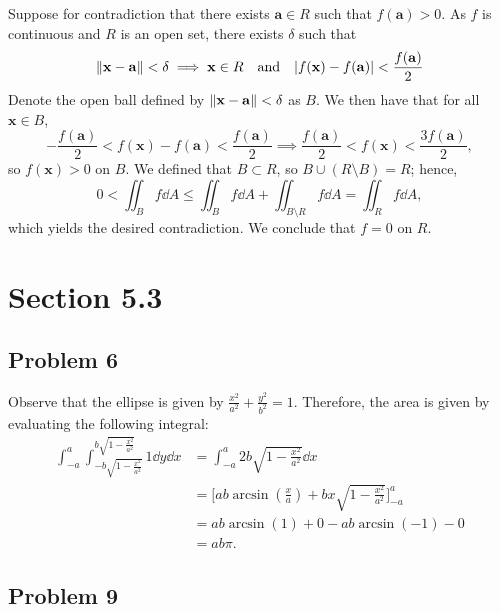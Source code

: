 \documentclass[11pt]{article}
\renewcommand{\vec}[1]{\mathbf{#1}}
\begin{document}
Suppose for contradiction that there exists $\vec{a} \in R$ such that $f(\vec{a}) > 0$. As $f$ is continuous and $R$ is an open set, there exists $\delta$ such that
\[
	\norm{\vec{x} - \vec{a}} < \delta \implies \vec{x} \in R \quad \text{and} \quad \abs{f(\vec{x}) - f(\vec{a})} < \frac{f(\vec{a})}{2}
\]
Denote the open ball defined by $\norm{\vec{x} - \vec{a}} < \delta$ as $B$. We then have that for all $\vec{x} \in B$, 
\[
	-\frac{f(\vec{a})}{2} < f(\vec{x}) - f(\vec{a}) < \frac{f(\vec{a})}{2} \implies \frac{f(\vec{a})}{2} < f(\vec{x}) < \frac{3f(\vec{a})}{2},
\]
so $f(\vec{x}) > 0$ on $B$. We defined that $B \subset R$, so $B \cup (R \setminus B) = R$; hence,
\[
	0 < \iint_{B} f \dd{A} \le \iint_{B} f \dd{A} + \iint_{B \setminus R} f \dd{A} = \iint_{R} f \dd{A},
\]
which yields the desired contradiction. We conclude that $f = 0$ on $R$.


\section{Section 5.3}


\subsection*{Problem 6}

Observe that the ellipse is given by $\tfrac{x^{2}}{a^{2}} + \tfrac{y^{2}}{b^{2}} = 1$. Therefore, the area is given by evaluating the following integral:
\begin{align*}
	\int_{-a}^{a} \int_{-b \sqrt{1 - \tfrac{x^{2}}{a^{2}}}}^{b \sqrt{1 - \tfrac{x^{2}}{a^{2}}}} 1 \dd{y} \dd{x} &=\int_{-a}^{a} 2b \sqrt{1 - \frac{x^{2}}{a^{2}}} \dd{x} \\
	&= \Big[ ab \arcsin \left( \tfrac{x}{a} \right) + bx \sqrt{1 - \tfrac{x^{2}}{a^{2}}} \Big]_{-a}^{a} \\
	&= ab \arcsin(1) + 0 - ab \arcsin(-1) - 0 \\
	&= \boxed{ab \pi}.
\end{align*}



\subsection*{Problem 9}
\end{document}
